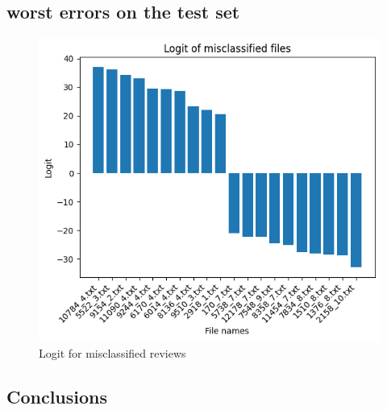 \documentclass[eng]{class}
\begin{document}
\subsection{worst errors on the test set}
\begin{figure}[h]
  \centering
  \includegraphics[width=.5\columnwidth]{images/missclassified.png}
  \caption{Logit for misclassified reviews}
  \label{fig-4}
\end{figure}

\subsection{Conclusions}

\end{document}
